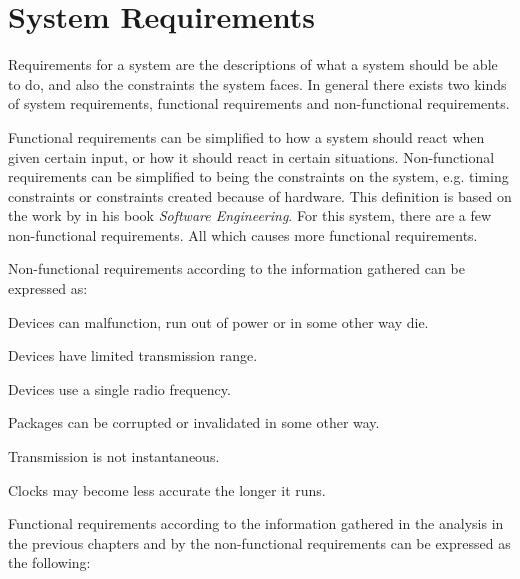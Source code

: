 \section{System Requirements}\label{requirements}
Requirements for a system are the descriptions of what a system should be able to do, and also the constraints the system faces.
In general there exists two kinds of system requirements, functional requirements and non-functional requirements. 

Functional requirements can be simplified to how a system should react when given certain input, or how it should react in certain situations.
Non-functional requirements can be simplified to being the constraints on the system, e.g. timing constraints or constraints created because of hardware.
This definition is based on the work by \citet[see][chapter 4]{SEBook} in his book \textit{Software Engineering}.
For this system, there are a few non-functional requirements. All which causes more functional requirements.

\bigskip \noindent
Non-functional requirements according to the information gathered can be expressed as:
\begin{enumberate}
    \item Devices can malfunction, run out of power or in some other way die.
    \item Devices have limited transmission range.
    \item Devices use a single radio frequency.
    \item Packages can be corrupted or invalidated in some other way.
    \item Transmission is not instantaneous.
    \item Clocks may become less accurate the longer it runs.
\end{enumberate}

\noindent
Functional requirements according to the information gathered in the analysis in the previous chapters and by the non-functional requirements can be expressed as the following: 


